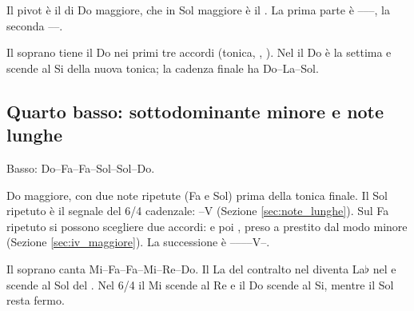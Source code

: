 Il pivot è il  di Do maggiore, che in Sol maggiore è il . La prima parte è ------, la seconda ----.

Il soprano tiene il Do nei primi tre accordi (tonica, , ). Nel  il Do è la settima e scende al Si della nuova tonica; la cadenza finale ha Do--La--Sol.

\begin{esempio}
	\label{ex:basso_svolto_3}
\end{esempio}

\subsection*{Quarto basso: sottodominante minore e note lunghe}

Basso: Do--Fa--Fa--Sol--Sol--Do.

Do maggiore, con due note ripetute (Fa e Sol) prima della tonica finale. Il Sol ripetuto è il segnale del 6/4 cadenzale: --V (Sezione \ref{sec:note_lunghe}). Sul Fa ripetuto si possono scegliere due accordi:  e poi , preso a prestito dal modo minore (Sezione \ref{sec:iv_maggiore}). La successione è --------V--.

Il soprano canta Mi--Fa--Fa--Mi--Re--Do. Il La del contralto nel  diventa La$\flat$ nel  e scende al Sol del . Nel 6/4 il Mi scende al Re e il Do scende al Si, mentre il Sol resta fermo.

\begin{esempio}
	\label{ex:basso_svolto_4}
\end{esempio}
